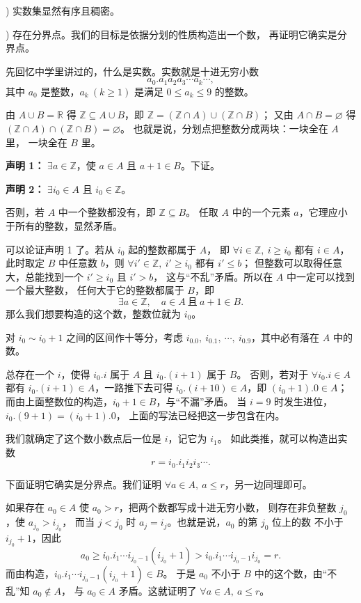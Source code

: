 \documentclass[UTF8,11pt]{ctexart}
\theoremstyle{cnthm}
\begin{document}
) 实数集显然有序且稠密。

) 存在分界点。我们的目标是依据分划的性质构造出一个数，
再证明它确实是分界点。

先回忆中学里讲过的，什么是实数。实数就是十进无穷小数
\[
a_0.a_1a_2a_3\cdots a_k\cdots,
\]
其中 $a_0$ 是整数，$a_k\ (k\geq1)$ 是满足
$0\leq a_k\leq9$ 的整数。

由 $A\cup B=\mathbb R$ 得 $\mathbb Z\subseteq A\cup B$，即
$\mathbb Z=(\mathbb Z\cap A)\cup(\mathbb Z\cap B)$；
又由 $A\cap B=\varnothing$ 得
$(\mathbb Z\cap A)\cap(\mathbb Z\cap B)=\varnothing$。
也就是说，分划点把整数分成两块：一块全在 $A$ 里，
一块全在 $B$ 里。

\textbf{声明 1：} $\exists a\in\mathbb Z$，使 $a\in A$ 且 $a+1\in B$。下证。

\textbf{声明 2：} $\exists i_0\in A$ 且 $i_0\in\mathbb Z$。

否则，若 $A$ 中一个整数都没有，即 $\mathbb Z\subseteq B$。
任取 $A$ 中的一个元素 $a$，它理应小于所有的整数，显然矛盾。

可以论证声明 1 了。若从 $i_0$ 起的整数都属于 $A$，
即 $\forall i\in\mathbb Z,\ i\geq i_0$ 都有 $i\in A$，
此时取定 $B$ 中任意数 $b$，则
$\forall i'\in\mathbb Z,\ i'\geq i_0$ 都有 $i'\leq b$；
但整数可以取得任意大，总能找到一个 $i'\geq i_0$ 且 $i'>b$，
这与“不乱”矛盾。所以在 $A$ 中一定可以找到一个最大整数，
任何大于它的整数都属于 $B$，即
\[
\exists a\in\mathbb Z,\quad a\in A\ \text{且}\ a+1\in B .
\]
那么我们想要构造的这个数，整数位就为 $i_0$。

对 $i_0\sim i_0+1$ 之间的区间作十等分，考虑
$i_0.0,\ i_0.1,\ \cdots,\ i_0.9$，其中必有落在 $A$ 中的数。

总存在一个 $i$，使得 $i_0.i$ 属于 $A$ 且
$i_0.(i+1)$ 属于 $B$。
否则，若对于 $\forall i_0.i\in A$ 都有
$i_0.(i+1)\in A$，一路推下去可得
$i_0.(i+10)\in A$，即 $(i_0+1).0\in A$；
而由上面整数位的构造，$i_0+1\in B$，与“不漏”矛盾。
当 $i=9$ 时发生进位，$i_0.(9+1)=(i_0+1).0$，
上面的写法已经把这一步包含在内。

我们就确定了这个数小数点后一位是 $i$，记它为 $i_1$。
如此类推，就可以构造出实数
\[
r=i_0.i_1i_2i_3\cdots .
\]

下面证明它确实是分界点。我们证明
$\forall a\in A,\ a\leq r$，另一边同理即可。

如果存在 $a_0\in A$ 使 $a_0>r$，把两个数都写成十进无穷小数，
则存在非负整数 $j_0$，使 $a_{j_0}>i_{j_0}$，
而当 $j<j_0$ 时 $a_j=i_j$。也就是说，$a_0$ 的第 $j_0$ 位上的数
不小于 $i_{j_0}+1$，因此
\[
a_0\geq i_0.i_1\cdots i_{j_0-1}(i_{j_0}+1)
>i_0.i_1\cdots i_{j_0-1}i_{j_0}=r .
\]
而由构造，$i_0.i_1\cdots i_{j_0-1}(i_{j_0}+1)\in B$。
于是 $a_0$ 不小于 $B$ 中的这个数，由“不乱”知 $a_0\notin A$，
与 $a_0\in A$ 矛盾。这就证明了
$\forall a\in A,\ a\leq r$。
\end{document}
